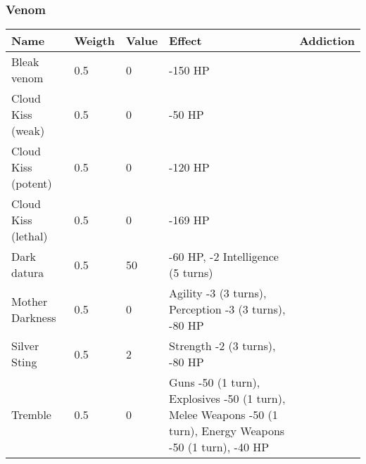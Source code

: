 
\subsubsection{Venom}
\begin{longtable}{|p{4cm}|p{1.2cm}|p{1.2cm}|p{4cm}|p{4cm}|}
\hline
\bfseries Name & \bfseries Weigth & \bfseries Value & \bfseries Effect & \bfseries Addiction \\
\hline
\endhead
Bleak venom  & 0.5  & 0 & -150 HP \\
Cloud Kiss (weak)  & 0.5  & 0 & -50 HP \\
Cloud Kiss (potent)  & 0.5  & 0 & -120 HP \\
Cloud Kiss (lethal)  & 0.5  & 0 & -169 HP \\
Dark datura  & 0.5  & 50 & -60 HP, -2 Intelligence (5 turns)  \\
Mother Darkness  & 0.5  & 0 & Agility -3 (3 turns), Perception -3 (3 turns), -80 HP \\
Silver Sting  & 0.5  & 2 & Strength -2 (3 turns), -80 HP  \\
Tremble  & 0.5  & 0 & Guns -50 (1 turn), Explosives -50 (1 turn), Melee Weapons -50 (1 turn), Energy Weapons -50 (1 turn), -40 HP \\
\hline
\end{longtable}
